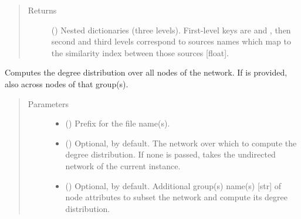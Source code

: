 \documentclass[letterpaper,10pt,english]{sphinxmanual}
\begin{document}
\begin{fulllineitems}
\begin{fulllineitems}
\begin{quote}
\begin{description}
\item[{Returns}] \leavevmode
() \textendash{} Nested dictionaries (three levels). First-level
keys are  and , then second and third
levels correspond to sources names which map to the
similarity index between those sources {[}float{]}.

\end{description}\end{quote}

\end{fulllineitems}


\begin{fulllineitems}
\label{\detokenize{reference:pypath.main.PyPath.degree_dist}}
Computes the degree distribution over all nodes of the network.
If  is provided, also across nodes of that group(s).
\begin{quote}\begin{description}
\item[{Parameters}] \leavevmode\begin{itemize}
\item {} 
 () \textendash{} Prefix for the file name(s).

\item {} 
 () \textendash{} Optional,  by default. The network over which to
compute the degree distribution. If none is passed, takes
the undirected network of the current instance.

\item {} 
 () \textendash{} Optional,  by default. Additional group(s) name(s)
{[}str{]} of node attributes to subset the network and compute
its degree distribution.

\end{itemize}

\end{description}\end{quote}


\end{fulllineitems}
\end{fulllineitems}
\end{document}
